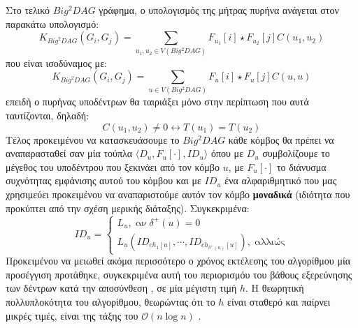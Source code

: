 Στο τελικό $Big^{2}DAG$ γράφημα, ο υπολογισμός της μήτρας πυρήνα ανάγεται στον παρακάτω υπολογισμό:
\begin{equation}
K_{Big^{2}DAG}(G_{i}, G_{j}) = \sum_{u_{1}, u_{2} \in V(Big^{2}DAG)} F_{u_{1}}[i] \star F_{u_{2}}[j] C(u_{1}, u_{2})
\end{equation}
που είναι ισοδύναμος με:
\begin{equation}
K_{Big^{2}DAG}(G_{i}, G_{j}) = \sum_{u \in V(Big^{2}DAG)} F_{u}[i] \star F_{u}[j] C(u, u)
\end{equation}
επειδή ο πυρήνας υποδέντρων θα ταιριάξει μόνο στην περίπτωση που αυτά ταυτίζονται, δηλαδή:
\begin{equation}
C(u_{1}, u_{2}) \not= 0 \leftrightarrow T(u_{1}) = T(u_{2})
\end{equation}
Τέλος προκειμένου να κατασκευάσουμε το $Big^{2}DAG$ κάθε κόμβος θα πρέπει να αναπαρασταθεί σαν μία τούπλα $\langle D_{u} , F_{u}[\cdot], ID_{u} \rangle$ όπου με $D_{u}$ συμβολίζουμε το μέγεθος του υποδέντρου που ξεκινάει από τον κόμβο $u$, με $F_{u}[\cdot]$ το διάνυσμα συχνότητας εμφάνισης αυτού του κόμβου και με $ID_{u}$ ένα αλφαριθμητικό που μας χρησιμεύει προκειμένου να αναπαριστούμε αυτόν τον κόμβο \textbf{μοναδικά} (ιδιότητα που προκύπτει από την σχέση μερικής διάταξης).
Συγκεκριμένα:
\begin{equation}
ID_{u} = \begin{cases}
            L_{u},\;\text{αν}\;\delta^{+}(u)=0\\
            L_{u}(ID_{ch_{1}[u]}, \cdots, ID_{ch_{\delta^{+}(u)}[u]}),\;\text{αλλιώς}
        \end{cases}
\end{equation}
Προκειμένου να μειωθεί ακόμα περισσότερο ο χρόνος εκτέλεσης του αλγορίθμου μία προσέγγιση προτάθηκε, συγκεκριμένα αυτή του περιορισμόυ του βάθους εξερεύνησης των δέντρων  κατά την αποσύνθεση , σε μία μέγιστη τιμή $h$.
Η θεωρητική πολλυπλοκότητα του αλγορίθμου, θεωρώντας ότι το $h$ είναι σταθερό και παίρνει μικρές τιμές, είναι της τάξης του $\mathcal{O}(n\log n)$ \cite[]{Martino2012ATK}.

